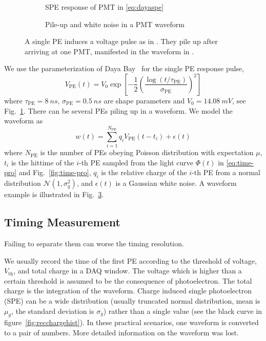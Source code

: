 \begin{figure}[H]
  \begin{subfigure}{.49\textwidth}
    \centering
    \resizebox{\textwidth}{!}{}
    \caption{\label{fig:spe} SPE response of PMT in \eqref{eq:dayaspe}}
  \end{subfigure}
  \begin{subfigure}{.49\textwidth}
    \centering
    \resizebox{\textwidth}{!}{}
    \caption{\label{fig:pile} Pile-up and white noise in a PMT waveform}
  \end{subfigure}
  \caption{A single PE induces a voltage pulse as in .  They pile up after arriving at one PMT, manifested in the waveform in .}
\end{figure}

We use the parameterization of Daya Bay~\cite{jetter_pmt_2012} for the single PE response pulse,
\begin{equation}
  V_\mathrm{PE}(t) = V_{0}\exp\left[-\frac{1}{2}\left(\frac{\log(t/\tau_\mathrm{PE})}{\sigma_\mathrm{PE}}\right)^{2}\right]
  \label{eq:dayaspe}
\end{equation}
where $\tau_\mathrm{PE}=\SI{8}{ns}$, $\sigma_\mathrm{PE}=\SI{0.5}{ns}$ are shape parameters and $V_{0}=\SI{14.08}{mV}$, see Fig.~\ref{fig:spe}.  There can be several PEs piling up in a waveform.  We model the waveform as
\begin{equation}
  \label{eq:1}
  w(t) = \sum_{i=1}^{N_\mathrm{PE}} q_i V_\mathrm{PE}(t-t_i) + \epsilon(t)
\end{equation}
where $N_\mathrm{PE}$ is the number of PEs obeying Poisson distribution with expectation $\mu$, $t_i$ is the hittime of the $i$-th PE sampled from the light curve $\Phi(t)$ in \eqref{eq:time-pro} and Fig.~\ref{fig:time-pro}, $q_i$ is the relative charge of the $i$-th PE from a normal distribution $\mathcal{N}(1,\sigma_{q}^2)$, and $\epsilon(t)$ is a Gaussian white noise.  A waveform example is illustrated in Fig.~\ref{fig:pile}.

\subsection{Timing Measurement}
Failing to separate them can worse the timing resolution.

We usually record the time of the first PE according to the threshold of voltage, $V_\mathrm{th}$, and total charge in a DAQ window. The voltage which is higher than a certain threshold is assumed to be the consequence of photoelectron. The total charge is the integration of the waveform. Charge induced single photoelectron (SPE) can be a wide distribution (usually truncated normal distribution, mean is $\mu_{g}$, the standard deviation is $\sigma_{g}$) rather than a single value (see the black curve in figure~\ref{fig:recchargehist}). In these practical scenarios, one waveform is converted to a pair of numbers. More detailed information on the waveform was lost. 

